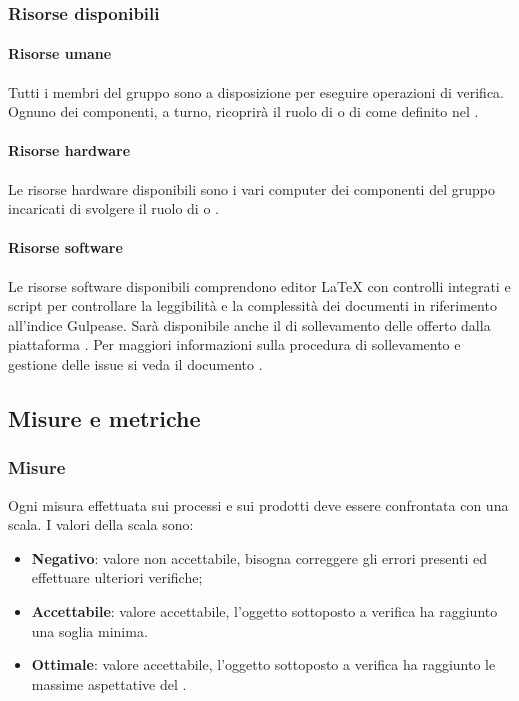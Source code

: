 \documentclass[PianoDiQualifica.tex]{subfiles}
\begin{document}
		\subsubsection{Risorse disponibili}
		
			\paragraph{Risorse umane}
			Tutti i membri del gruppo sono a disposizione per eseguire operazioni di verifica. Ognuno dei componenti, a turno, ricoprirà il ruolo di \RESP{} o di \VER{} come definito nel \PPdocRR{}.
			
			\paragraph{Risorse hardware}
			Le risorse hardware disponibili sono i vari computer dei componenti del gruppo incaricati di svolgere il ruolo di \RESP{} o \VER{}.
			
			\paragraph{Risorse software}
			Le risorse software disponibili comprendono editor \LaTeX{} con controlli integrati e script per controllare la leggibilità e la complessità dei documenti in riferimento all’indice Gulpease.
			Sarà disponibile anche il  di sollevamento delle  offerto dalla piattaforma . Per maggiori informazioni sulla procedura di sollevamento e gestione delle issue si veda
			il documento \NPdocRR{}.
			
	\subsection{Misure e metriche}
	
		\subsubsection{Misure}
		Ogni misura effettuata sui processi e sui prodotti deve essere confrontata con una scala. I valori della scala sono:
		\begin{itemize}
			\item \textbf{Negativo}: valore non accettabile, bisogna correggere gli errori presenti ed effettuare ulteriori verifiche;
			\item \textbf{Accettabile}: valore accettabile, l’oggetto sottoposto a verifica ha raggiunto una soglia minima.
			\item \textbf{Ottimale}: valore accettabile, l’oggetto sottoposto a verifica ha raggiunto le massime aspettative del .
		\end{itemize}
		
\end{document}
